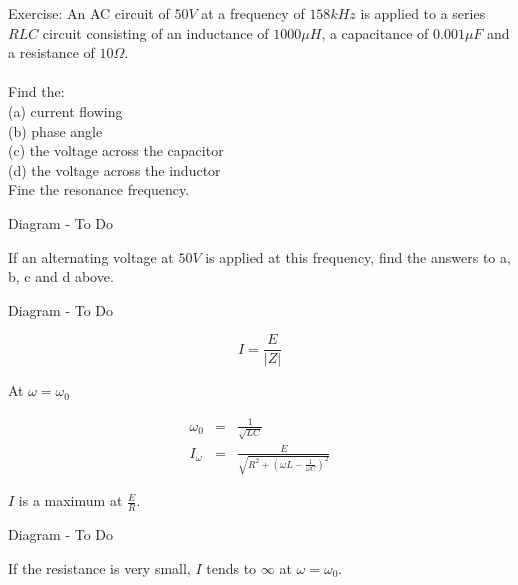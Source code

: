\documentclass[a4paper,12pt]{article}
\begin{document}

Exercise: An AC circuit of $50V$ at a frequency of $158 kHz$ is applied
to a series $RLC$ circuit consisting of an inductance of $1000 \mu H$, a
capacitance of $0.001 \mu F$ and a resistance of $10\Omega$. \\ \\

Find the: \\ 

(a) current flowing \\

(b) phase angle \\

(c) the voltage across the capacitor \\

(d) the voltage across the inductor \\

Fine the resonance frequency.

\begin{table}[hbtp]

Diagram - To Do

\end{table}

If an alternating voltage at $50V$ is applied at this frequency, find
the answers to a, b, c and d above.


\begin{table}[hbtp]

Diagram - To Do

\end{table}

\[ I = \frac{E}{\left| Z \right|} \]

At $\omega = \omega_{0}$

\begin{eqnarray*}
\omega_{0} & = &\frac{1}{\sqrt{LC}} \\
I_{\omega} & = & \frac{E}{\sqrt{R^{2} + \left(\omega L - \frac{1}{\omega
C}\right)^{2}}}
\end{eqnarray*}

$I$ is a maximum at $\frac{E}{R}$.

\begin{table}[hbtp]

Diagram - To Do

\end{table}

If the resistance is very small, $I$ tends to $\infty$ at $\omega =
\omega_{0}$.
\end{document}
